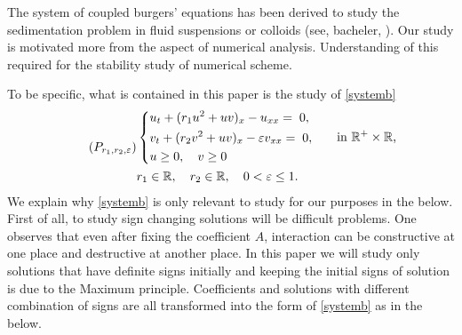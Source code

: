 \documentclass{amsart}
\def\blue{\color{blue}}
\theoremstyle{definition}
\numberwithin{equation}{section}
\begin{document}



{\blue The system of coupled burgers' equations has been derived to study the sedimentation problem in fluid suspensions or colloids (see, bacheler, \cite{esipov_1955}). Our study is motivated more from the aspect of numerical analysis. Understanding of this required for the stability study of numerical scheme.}

To be specific, what is contained in this paper is the study of \eqref{systemb}
\begin{equation}\label{systemb} \tag{$P_{r_1,r_2,\varepsilon}$}
\begin{aligned}
&\left\{
\begin{aligned}
&u_{t} + ( r_{1}u^{2} + uv )_{x} -u_{xx} = \; 0, \\
&v_{t} + ( r_{2}v^{2} + uv )_{x} -\varepsilon v_{xx} = \; 0 ,\\
&u\ge0, \quad v\ge0
\end{aligned} \quad \quad \text{in $\mathbb{R}^+\times \mathbb{R}$,}\right.\\
&  r_1\in \mathbb{R}, \quad r_2 \in \mathbb{R}, \quad 0<\varepsilon\le 1.
\end{aligned}
\end{equation}
We explain why \eqref{systemb} is only relevant to study for our purposes in the below. First of all, to study sign changing solutions will be difficult problems. One observes that even after fixing the coefficient $A$, interaction can be constructive at one place and destructive at another place. In this paper we will study only solutions that have definite signs initially and keeping the initial signs of solution is due to the Maximum principle. Coefficients and solutions with different combination of signs are all transformed into the form of \eqref{systemb} as in the below. %
\end{document}

